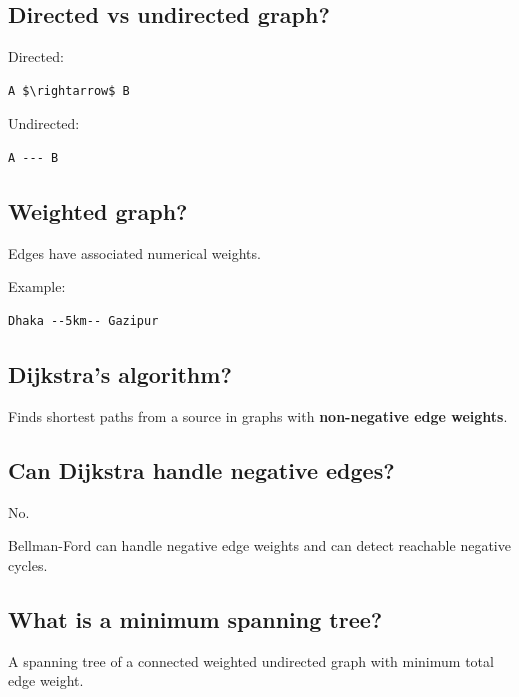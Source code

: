 \medskip

\subsection{Directed vs undirected graph?}

Directed:

\begin{lstlisting}
A $\rightarrow$ B
\end{lstlisting}

Undirected:

\begin{lstlisting}
A --- B
\end{lstlisting}

\medskip

\subsection{Weighted graph?}

Edges have associated numerical weights.

Example:

\begin{lstlisting}
Dhaka --5km-- Gazipur
\end{lstlisting}

\medskip

\subsection{Dijkstra's algorithm?}

Finds shortest paths from a source in graphs with \textbf{non-negative edge weights}.

\medskip

\subsection{Can Dijkstra handle negative edges?}

No.

Bellman-Ford can handle negative edge weights and can detect reachable negative cycles.

\medskip

\subsection{What is a minimum spanning tree?}

A spanning tree of a connected weighted undirected graph with minimum total edge weight.

